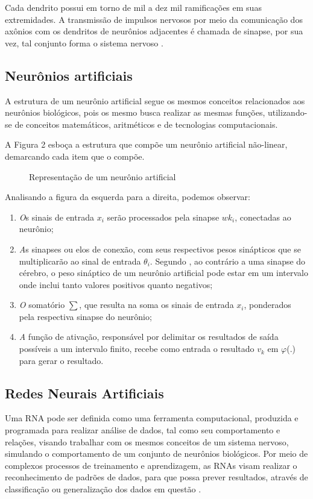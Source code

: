 Cada dendrito possui em torno de mil a dez mil ramificações em suas extremidades. A transmissão de impulsos nervosos por meio da comunicação dos axônios com os dendritos de neurônios adjacentes é chamada de sinapse, por sua vez, tal conjunto forma o sistema nervoso \cite{neto}.

\subsection{Neurônios artificiais}
A estrutura de um neurônio artificial segue os mesmos conceitos relacionados aos neurônios biológicos, pois os mesmo busca realizar as mesmas funções, utilizando-se de conceitos matemáticos, aritméticos e de tecnologias computacionais.

A Figura 2 esboça a estrutura que compõe um neurônio artificial não-linear, demarcando cada item que o compõe. 

\begin{figure}[h]
	\centering
	\caption{Representação de um neurônio artificial}
	\label{exec-linearmente-separavel}
\end{figure}

Analisando a figura da esquerda para a direita, podemos observar: 

\begin{enumerate}
	\item \textit Os sinais de entrada $x_i$ serão processados pela sinapse $wk_i$, conectadas ao neurônio;
	\item \textit As sinapses ou elos de conexão, com seus respectivos pesos sinápticos que se multiplicarão ao sinal de entrada $\theta_i$. Segundo , ao contrário a uma sinapse do cérebro, o peso sináptico de um neurônio artificial pode estar em um intervalo onde inclui tanto valores positivos quanto negativos;
	\item \textit O somatório $\sum$, que resulta na soma os sinais de entrada $x_i$, ponderados pela respectiva sinapse do neurônio;
	\item \textit A função de ativação, responsável por delimitar os resultados de saída possíveis a um intervalo finito, recebe como entrada o resultado $v_k$ em $\varphi$(.) para gerar o resultado.
\end{enumerate}

\subsection{Redes Neurais Artificiais}\label{sec:redes-neurais}
Uma RNA pode ser definida como uma ferramenta computacional, produzida e programada para realizar análise de dados, tal como seu comportamento e relações, visando trabalhar com os mesmos conceitos de um sistema nervoso, simulando o comportamento de um conjunto de neurônios biológicos. Por meio de complexos processos de treinamento e aprendizagem, as RNAs visam realizar o reconhecimento de padrões de dados, para que possa prever resultados, através de classificação ou generalização dos dados em questão \cite{haykin2009}.

